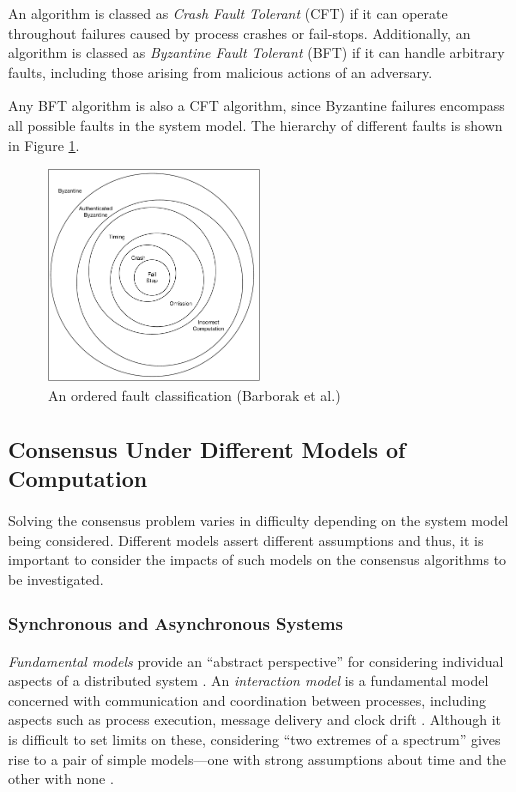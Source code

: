\documentclass[12pt, a4paper]{article}
\begin{document}
An algorithm is classed as \textit{Crash Fault Tolerant} (CFT) if it can operate throughout failures caused by process crashes or fail-stops. Additionally, an algorithm is classed as \textit{Byzantine Fault Tolerant} (BFT) if it can handle arbitrary faults, including those arising from malicious actions of an adversary.

Any BFT algorithm is also a CFT algorithm, since Byzantine failures encompass all possible faults in the system model. The hierarchy of different faults \cite{barborak1993consensus} is shown in Figure \ref{fig:aofc}.

\begin{figure}[htp]
  \centering
  \includegraphics[width=0.5\textwidth]{img/AOFC.pdf}
  \caption{An ordered fault classification (Barborak et al.)}
  \label{fig:aofc}
\end{figure}

\subsection{Consensus Under Different Models of Computation} \label{sec:fundamental-models}
Solving the consensus problem varies in difficulty depending on the system model being considered. Different models assert different assumptions and thus, it is important to consider the impacts of such models on the consensus algorithms to be investigated.

\subsubsection{Synchronous and Asynchronous Systems}
\textit{Fundamental models} provide an ``abstract perspective'' for considering individual aspects of a distributed system \cite{coulouris2005distributed}. An \textit{interaction model} is a fundamental model concerned with communication and coordination between processes, including aspects such as process execution, message delivery and clock drift \cite{coulouris2005distributed}. Although it is difficult to set limits on these, considering ``two extremes of a spectrum'' gives rise to a pair of simple models---one with strong assumptions about time and the other with none \cite{coulouris2005distributed, hadzilacos1994modular}.
\end{document}
